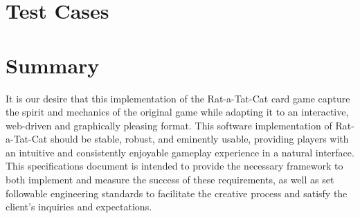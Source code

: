 \documentclass[12pt]{IEEEtran}
\begin{document}
\section{Test Cases}
\label{sec:test}

\section{Summary}
\label{sec:summary}

	It is our desire that this implementation of the Rat-a-Tat-Cat card game capture the spirit and mechanics of the original game while adapting it to an interactive, web-driven and graphically pleasing format. This software implementation of Rat-a-Tat-Cat should be stable, robust, and eminently usable, providing players with an intuitive and consistently enjoyable gameplay experience in a natural interface. This specifications document is intended to provide the necessary framework to both implement and measure the success of these requirements, as well as set followable engineering standards to facilitate the creative process and satisfy the client’s inquiries and expectations.
\end{document}
